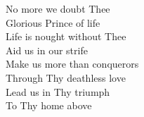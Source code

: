 \documentclass{beamer}
\begin{document}
{\begin{frame}{}
\end{frame}

\hypertarget{Thine be the glory[]3}{}
\begin{frame}{}
\fontsize{ 18 }{ 23 }\selectfont

No more we doubt Thee\\ 
Glorious Prince of life\\ 
Life is nought without Thee\\ 
Aid us in our strife\\ 
Make us more than conquerors\\ 
Through Thy deathless love\\ 
Lead us in Thy triumph\\ 
To Thy home above 

\end{frame}

}
\end{document}
